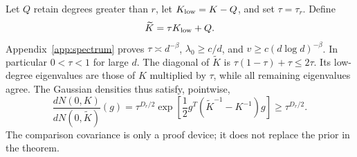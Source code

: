 \documentclass[11pt]{article}
\theoremstyle{remark}\newtheorem{remark}[theorem]{Remark}
\begin{document}
Let $Q$ retain degrees greater than $r$, let $K_{\rm low}=K-Q$, and set $\tau=\tau_r$. Define
\[
 \widetilde K=\tau K_{\rm low}+Q.
\]
Appendix~\ref{app:spectrum} proves $\tau\asymp d^{-\beta}$, $\lambda_0\ge c/d$, and $v\ge c(d\log d)^{-\beta}$. In particular $0<\tau<1$ for large $d$. The diagonal of $\widetilde K$ is $\tau(1-\tau)+\tau\le2\tau$. Its low-degree eigenvalues are those of $K$ multiplied by $\tau$, while all remaining eigenvalues agree. The Gaussian densities thus satisfy, pointwise,
\begin{equation}\label{eq:density-compare}
 \frac{dN(0,K)}{dN(0,\widetilde K)}(g)
 =\tau^{D_r/2}\exp\!\left[\frac12g^T(\widetilde K^{-1}-K^{-1})g\right]
 \ge\tau^{D_r/2}.
\end{equation}
The comparison covariance is only a proof device; it does not replace the prior in the theorem.
\end{document}
